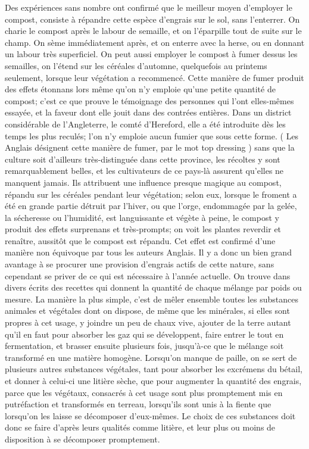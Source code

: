 Des expériences sans nombre ont confirmé que le meilleur moyen d'employer le compost, consiste à répandre cette espèce d'engrais sur le sol, sans l'enterrer. On charie le compost après le labour de semaille, et on l'éparpille tout de suite sur le champ. On sème immédiatement après, et on enterre avec la herse, ou en donnant un labour très superficiel. On peut aussi employer le compost à fumer dessus les semailles, on l'étend sur les céréales d'automne, quelquefois au printems seulement,\setcounter{page}{59} lorsque leur végétation a recommencé. Cette manière de fumer produit des effets étonnans lors même qu'on n'y emploie qu'une petite quantité de compost; c'est ce que prouve le témoignage des personnes qui l'ont elles-mêmes essayée, et la faveur dont elle jouit dans des contrées entières. Dans un district considérable de l'Angleterre, le comté d'Hereford, elle a été introduite dès les temps les plus reculés; l'on n'y emploie aucun fumier que sous cette forme. ( Les Anglais désignent cette manière de fumer, par le mot top dressing ) sans que la culture soit d'ailleurs très-distinguée dans cette province, les récoltes y sont remarquablement belles, et les cultivateurs de ce pays-là assurent qu'elles ne manquent jamais. Ils attribuent une influence presque magique au compost, répandu sur les céréales pendant leur végétation; selon eux, lorsque le froment a été en grande partie détruit par l'hiver, ou que l'orge, endommagée par la gelée, la sécheresse ou l'humidité, est languissante et végète à peine, le compost y produit des effets surprenans et très-prompts; on voit les plantes reverdir et renaître, aussitôt que le compost est répandu. Cet effet est confirmé d'une manière non équivoque\setcounter{page}{60} par tous les auteurs Anglais. Il y a donc un bien grand avantage à se procurer une provision d'engrais actifs de cette nature, sans cependant se priver de ce qui est nécessaire à l'année actuelle.
On trouve dans divers écrits des recettes qui donnent la quantité de chaque mélange par poids ou mesure. La manière la plus simple, c'est de mêler ensemble toutes les substances animales et végétales dont on dispose, de même que les minérales, si elles sont propres à cet usage, y joindre un peu de chaux vive, ajouter de la terre autant qu'il en faut pour absorber les gaz qui se développent, faire entrer le tout en fermentation, et brasser ensuite plusieurs fois, jusqu'à-ce que le mélange soit transformé en une matière homogène.
Lorsqu'on manque de paille, on se sert de plusieurs autres substances végétales, tant pour absorber les excrémens du bétail, et donner à celui-ci une litière sèche, que pour augmenter la quantité des engrais, parce que les végétaux, consacrés à cet usage sont plus promptement mis en putréfaction et transformés en terreau, lorsqu'ils sont unis à la fiente que lorsqu'on les laisse se décomposer d'eux-mêmes. Le choix de ces substances\setcounter{page}{61} doit donc se faire d'après leurs qualités comme litière, et leur plus ou moins de disposition à se décomposer promptement.
